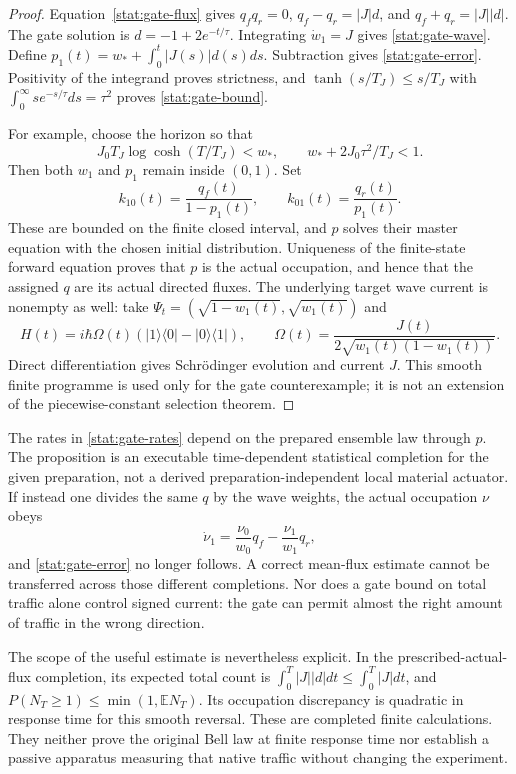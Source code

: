 \documentclass[11pt,oneside,openany]{book}
\theoremstyle{definition}
\theoremstyle{remark}\newtheorem{remark}[theorem]{Remark}
\begin{document}
\begin{proof}
Equation~\eqref{stat:gate-flux} gives
$q_fq_r=0$, $q_f-q_r=|J|d$, and $q_f+q_r=|J||d|$.
The gate solution is $d=-1+2e^{-t/\tau}$. Integrating $\dot w_1=J$ gives
\eqref{stat:gate-wave}. Define
$p_1(t)=w_*+\int_0^t|J(s)|d(s)ds$. Subtraction gives
\eqref{stat:gate-error}. Positivity of the integrand proves strictness,
and $\tanh(s/T_J)\leq s/T_J$ with
$\int_0^\infty s e^{-s/\tau}ds=\tau^2$ proves
\eqref{stat:gate-bound}.

For example, choose the horizon so that
\[
 J_0T_J\log\cosh(T/T_J)<w_*,\qquad
 w_*+2J_0\tau^2/T_J<1.
\]
Then both $w_1$ and $p_1$ remain inside $(0,1)$. Set
\begin{equation}\label{stat:gate-rates}
 k_{10}(t)=\frac{q_f(t)}{1-p_1(t)},\qquad
 k_{01}(t)=\frac{q_r(t)}{p_1(t)}.
\end{equation}
These are bounded on the finite closed interval, and $p$ solves their
master equation with the chosen initial distribution. Uniqueness of the
finite-state forward equation proves that $p$ is the actual occupation,
and hence that the assigned $q$ are its actual directed fluxes.
The underlying target wave current is nonempty as well: take
$\Psi_t=(\sqrt{1-w_1(t)},\sqrt{w_1(t)})$ and
\[
 H(t)=i\hbar\Omega(t)(|1\rangle\langle0|-|0\rangle\langle1|),
 \qquad
 \Omega(t)=\frac{J(t)}{2\sqrt{w_1(t)(1-w_1(t))}}.
\]
Direct differentiation gives Schr\"odinger evolution and current $J$.
This smooth finite programme is used only for the gate counterexample;
it is not an extension of the piecewise-constant selection theorem.
\end{proof}

The rates in \eqref{stat:gate-rates} depend on the prepared ensemble law
through $p$. The proposition is an executable time-dependent statistical
completion for the given preparation, not a derived preparation-independent
local material actuator. If instead one divides the same $q$ by the wave
weights, the actual occupation $\nu$ obeys
\begin{equation}\label{stat:gate-wrong-denominator}
 \dot\nu_1=\frac{\nu_0}{w_0}q_f-\frac{\nu_1}{w_1}q_r,
\end{equation}
and \eqref{stat:gate-error} no longer follows. A correct mean-flux estimate
cannot be transferred across those different completions. Nor does a gate
bound on total traffic alone control signed current: the gate can permit
almost the right amount of traffic in the wrong direction.

The scope of the useful estimate is nevertheless explicit. In the
prescribed-actual-flux completion, its expected total count is
$\int_0^T|J||d|dt\leq\int_0^T|J|dt$, and
$P(N_T\geq1)\leq\min(1,\mathbb E N_T)$. Its occupation discrepancy is
quadratic in response time for this smooth reversal. These are completed
finite calculations. They neither prove the original Bell law at finite
response time nor establish a passive apparatus measuring that native
traffic without changing the experiment.
\end{document}
